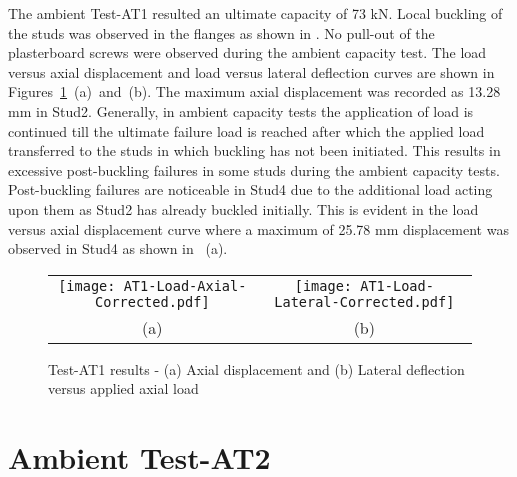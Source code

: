 The ambient Test-AT1 resulted an ultimate capacity of 73 kN. Local buckling of the studs was observed in the flanges as shown in . No pull-out of the plasterboard screws were observed during the ambient capacity test. The load versus axial displacement and load versus lateral deflection curves are shown in Figures~\ref{fig:AT1-results}~(a)~and~(b). The maximum axial displacement was recorded as 13.28 mm in Stud2. Generally, in ambient capacity tests the application of load is  continued till the ultimate failure load is reached after which the applied load transferred to the studs in which buckling has not been initiated. This results in excessive post-buckling failures in some studs during the ambient capacity tests. Post-buckling failures are noticeable in Stud4 due to the additional load acting upon them as Stud2 has already buckled initially. This is evident in the load versus axial displacement curve where a maximum of 25.78 mm displacement was observed in Stud4 as shown in ~(a).
\begin{figure}[!htbp]
	\centering
		\begin{tabular}{cc}
			\texttt{[image: AT1-Load-Axial-Corrected.pdf]} & \texttt{[image: AT1-Load-Lateral-Corrected.pdf]} \\ 
			(a) & (b)  \\ 
		\end{tabular} 
		\caption{Test-AT1 results - (a) Axial displacement and (b) Lateral deflection versus applied axial load}
		\label{fig:AT1-results}
\end{figure}

\section{Ambient Test-AT2}

